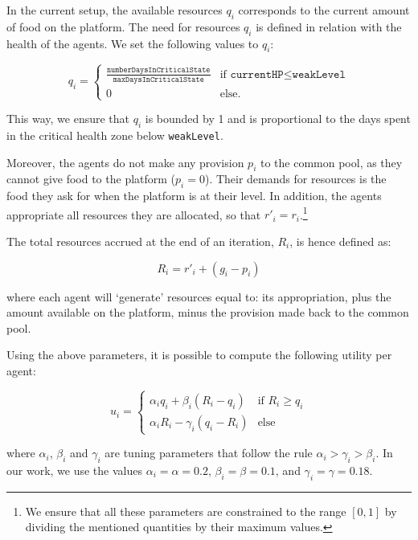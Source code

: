 In the current setup, the available resources $q_i$ corresponds to the current amount of food on the platform.  The need for resources $q_i$ is defined in relation with the health of the agents. We set the following values to $q_i$:

\begin{equation}\label{resources_needed}
    q_i=\begin{cases}
     \frac{\texttt{numberDaysInCriticalState}}{\texttt{maxDaysInCriticalState}} & \mbox{if } \texttt{currentHP}\leq \texttt{weakLevel}  \\ 
     0 & \mbox{else.}
     \end{cases}
\end{equation}

This way, we ensure that $q_i$ is bounded by 1 and is proportional to the days spent in the critical health zone below \texttt{weakLevel}.

Moreover, the agents do not make any provision $p_i$ to the common pool, as they cannot give food to the platform ($p_i=0$). Their demands for resources is the food they ask for when the platform is at their level. In addition, the agents appropriate all resources they are allocated, so that $r'_i=r_i$.\footnote{We ensure that all these parameters are constrained to the range $[0,1]$ by dividing the mentioned quantities by their maximum values.}

The total resources accrued at the end of an iteration, $R_i$, is hence defined as:

\begin{equation}\label{resources_accrued}
    R_i=r'_i+ (g_i-p_i)
\end{equation}

where each agent will `generate' resources equal to: its appropriation, plus the amount available on the platform, minus the provision made back to the common pool.

Using the above parameters, it is possible to compute the following utility per agent:

\begin{equation}\label{utility_per_agent}
    u_i=\begin{cases}
     \alpha_iq_i + \beta_i(R_i-q_i) & \mbox{if } R_i\geq q_i  \\ 
     \alpha_i R_i - \gamma_i(q_i-R_i) & \mbox{else}
     \end{cases}
\end{equation}


where $\alpha_i$, $\beta_i$ and $\gamma_i$ are tuning parameters that follow the rule $\alpha_i>\gamma_i>\beta_i$. In our work, we use the values $\alpha_i=\alpha=0.2$, $\beta_i=\beta=0.1$, and $\gamma_i=\gamma=0.18$.

